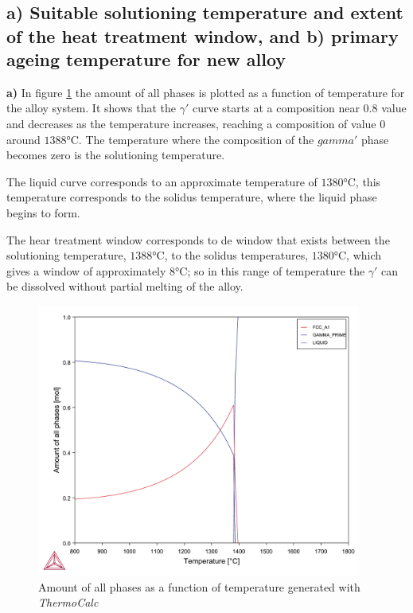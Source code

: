 \section{}

\subsection{a) Suitable solutioning temperature and extent of the heat treatment window, and b) primary ageing temperature for new alloy}

\textbf{a)} In figure \ref{fig:diagram05} the amount of all phases is plotted as a function of temperature for the alloy system. It shows that the $\gamma'$ curve starts at a composition near $0.8$ value and decreases as the temperature increases, reaching a composition of value $0$ around $1388$°C. The temperature where the composition of the $gamma'$ phase becomes zero is the solutioning temperature. 

The liquid curve corresponds to an approximate temperature of $1380$°C, this temperature corresponds to the solidus temperature, where the liquid phase begins to form. 

The hear treatment window corresponds to de window that exists between the solutioning temperature, $1388$°C, to the solidus temperatures, $1380$°C, which gives a window of approximately $8$°C; so in this range of temperature the $\gamma'$ can be dissolved without partial melting of the alloy.

\begin{figure}[h]
  \centering
    \includegraphics[width=0.95\textwidth]{graficas/Q4_02.pdf}
    \caption{Amount of all phases as a function of temperature generated with \textit{ThermoCalc} \citep{thermocalc}}
    \label{fig:diagram05}
\end{figure}

